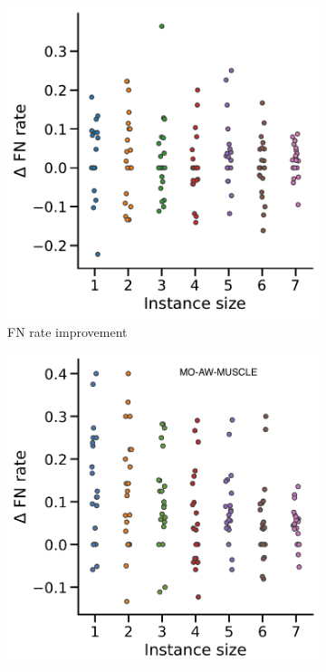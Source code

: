 \begin{figure}[!htbp]
\begin{adjustwidth}{-1.2cm}{}
\begin{subfigure}{0.40\textwidth}
		\end{subfigure}
		\begin{subfigure}{0.40\textwidth} \includegraphics[width=\textwidth]{Figure/delta4-ast} \caption{ FN rate improvement}\label{fig:scatter-ast}\end{subfigure}
		\begin{subfigure}{0.40\textwidth} \includegraphics[width=\textwidth]{Figure/delta4-momuscle.png} 
		\end{subfigure}
		

\end{adjustwidth}
\end{figure}
